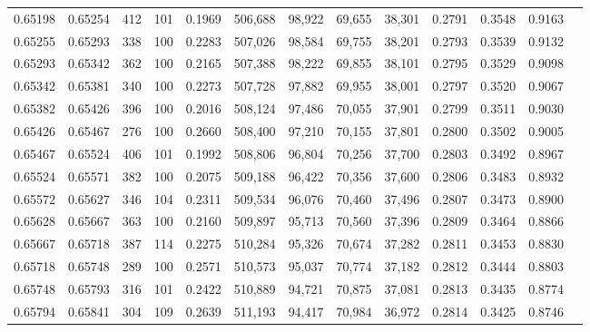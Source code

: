 \begin{tabular}{rrrrrrrrrrrrr}
0.65198 & 0.65254 &   412 & 101 &                                     0.1969 & 506,688 &  98,922 &  69,655 &  38,301 & 0.2791 & 0.3548 & 0.9163 \\
0.65255 & 0.65293 &   338 & 100 &                                     0.2283 & 507,026 &  98,584 &  69,755 &  38,201 & 0.2793 & 0.3539 & 0.9132 \\
0.65293 & 0.65342 &   362 & 100 &                                     0.2165 & 507,388 &  98,222 &  69,855 &  38,101 & 0.2795 & 0.3529 & 0.9098 \\
0.65342 & 0.65381 &   340 & 100 &                                     0.2273 & 507,728 &  97,882 &  69,955 &  38,001 & 0.2797 & 0.3520 & 0.9067 \\
0.65382 & 0.65426 &   396 & 100 &                                     0.2016 & 508,124 &  97,486 &  70,055 &  37,901 & 0.2799 & 0.3511 & 0.9030 \\
0.65426 & 0.65467 &   276 & 100 &                                     0.2660 & 508,400 &  97,210 &  70,155 &  37,801 & 0.2800 & 0.3502 & 0.9005 \\
0.65467 & 0.65524 &   406 & 101 &                                     0.1992 & 508,806 &  96,804 &  70,256 &  37,700 & 0.2803 & 0.3492 & 0.8967 \\
0.65524 & 0.65571 &   382 & 100 &                                     0.2075 & 509,188 &  96,422 &  70,356 &  37,600 & 0.2806 & 0.3483 & 0.8932 \\
0.65572 & 0.65627 &   346 & 104 &                                     0.2311 & 509,534 &  96,076 &  70,460 &  37,496 & 0.2807 & 0.3473 & 0.8900 \\
0.65628 & 0.65667 &   363 & 100 &                                     0.2160 & 509,897 &  95,713 &  70,560 &  37,396 & 0.2809 & 0.3464 & 0.8866 \\
0.65667 & 0.65718 &   387 & 114 &                                     0.2275 & 510,284 &  95,326 &  70,674 &  37,282 & 0.2811 & 0.3453 & 0.8830 \\
0.65718 & 0.65748 &   289 & 100 &                                     0.2571 & 510,573 &  95,037 &  70,774 &  37,182 & 0.2812 & 0.3444 & 0.8803 \\
0.65748 & 0.65793 &   316 & 101 &                                     0.2422 & 510,889 &  94,721 &  70,875 &  37,081 & 0.2813 & 0.3435 & 0.8774 \\
0.65794 & 0.65841 &   304 & 109 &                                     0.2639 & 511,193 &  94,417 &  70,984 &  36,972 & 0.2814 & 0.3425 & 0.8746 \\

\end{tabular}
